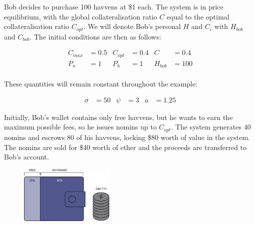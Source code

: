 \noindent Bob decides to purchase 100 havvens at \$1 each.
The system is in price equilibrium, with the global collateralisation
ratio $C$ equal to the optimal collateralisation ratio
$C_{opt}$. We will denote Bob's personal \(H\) and \(C_i\) with
\(H_{bob}\) and \(C_{bob}\). The initial conditions are then as follows:

\begin{align*}
C_{max} &= 0.5 & C_{opt} &= 0.4 & C &= 0.4 \\
P_n &= 1 & P_h &= 1 & H_{bob} &= 100 \\
\end{align*}

\noindent These quantities will remain constant throughout the example:

\begin{align*}
\sigma &= 50 & \psi &= 3 & a&= 1.25
\end{align*}

\vspace{4mm}

\noindent Initially, Bob's wallet contains only free havvens, but he wants to
earn the maximum possible fees, so he issues nomins up to $C_{opt}$.
The system generates 40 nomins and escrows 80 of his havvens,
locking \$80 worth of value in the system. The nomins are sold for \$40 worth
of ether and the proceeds are transferred to Bob's account.


\begin{figure}[h!]
    \centering
    \includegraphics[width=0.40\textwidth]{img/escrowed}
\end{figure}

